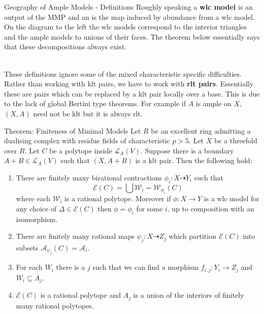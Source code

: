 \documentclass[final]{beamer}
\begin{document}
\begin{frame}[t, fragile]
\begin{columns}[t]
\begin{column}{0.44\paperwidth}
\begin{block}{Geography of Ample Models - Definitions}
				Roughly speaking a \textbf{wlc model} is an output of the MMP and an  is the map induced by abundance from a wlc model. On the diagram to the left the wlc models correspond to the interior triangles and the ample models to unions of their faces. The theorem below essentially says that these decompositions always exist.
				
				\\
				\hfill \break
				These definitions ignore some of the mixed characteristic specific difficulties. Rather than working with klt pairs, we have to work with \textbf{rlt pairs}. Essentially these are pairs which can be replaced by a klt pair locally over a base. This is due to the lack of global Bertini type theorems. For example if $A$ is ample on $X$, $(X,A)$ need not be klt but it is always rlt.
				
			\end{block}
			
			\begin{alertblock}{Theorem: Finiteness of Minimal Models}
				Let $R$ be an excellent ring admitting a dualising complex with residue fields of characteristic $p > 5$.
				Let $X$ be a threefold over $R$. Let $C$ be a polytope inside $\mathcal{L}_{A}(V)$. Suppose there is a boundary $A+B \in \mathcal{L}_{A}(V)$ such that $(X,A+B)$ is a klt pair. Then the following hold:
				
				\begin{enumerate}
					\item There are finitely many birational contractions $\phi_{i}:X \dashrightarrow Y_{i}$ such that 
					\[\mathcal{E}(C) = \bigcup \mathcal{W}_{i}=\mathcal{W}_{\phi_{i}}(C)\]
					where each $\mathcal{W}_{i}$ is a rational polytope. Moreover if $\phi:X \to Y$ is a wlc model for any choice of $\Delta \in \mathcal{E}(C)$ then $\phi=\phi_{i}$ for some $i$, up to composition with an isomorphism.
					
					\item There are finitely many rational maps $\psi_{j}:X \dashrightarrow Z_{j}$ which partition $\mathcal{E}(C)$ into subsets $\mathcal{A}_{\psi_{j}}(C)=\mathcal{A}_{i}$.
					\item  For each $W_{i}$ there is a $j$ such that we can find a morphism $f_{i,j}: Y_{i} \to Z_{j}$ and $W_{i} \subseteq \overline{A_{j}}$.
					\item  $\mathcal{E}(C)$ is a rational polytope and $A_{j}$ is a union of the interiors of finitely many rational polytopes.
				\end{enumerate}
			\end{alertblock}
			

\end{column}
\end{columns}
\end{frame}
\end{document}

